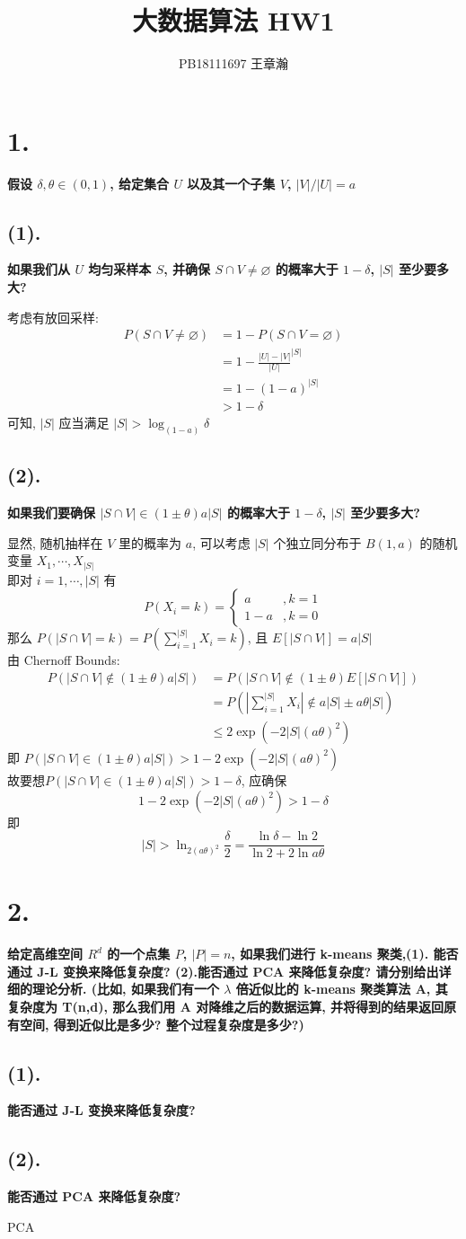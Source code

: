 \documentclass[UTF8]{article}
\title{大数据算法 HW1}
\author{PB18111697 王章瀚}
\newcommand{\jumpLine} {\hspace*{\fill} \par}
\begin{document}
\section*{1.}
\noindent \textbf{假设 $\delta, \theta\in (0,1)$, 给定集合 $U$ 以及其一个子集 $V$, $|V|/|U|=a$}
\subsection*{(1).}
\noindent \textbf{如果我们从 $U$ 均匀采样本 $S$, 并确保 $S\cap V\not=\varnothing$ 的概率大于 $1-\delta$, $|S|$ 至少要多大?}
\jumpLine \noindent 
考虑有放回采样:
\begin{align*}
	P(S\cap V\not=\varnothing)&=1-P(S\cap V=\varnothing) \\
	&=1- \frac{|U|-|V|}{|U|}^{|S|} \\
	&=1-(1-a)^{|S|} \\
	&>1-\delta
\end{align*}
可知, $|S|$ 应当满足 $|S|>\log_{(1-a)}\delta$

\subsection*{(2).}
\noindent \textbf{如果我们要确保 $|S\cap V|\in (1\pm\theta)a|S|$ 的概率大于 $1-\delta$, $|S|$ 至少要多大?}
\jumpLine \noindent 
显然, 随机抽样在 $V$ 里的概率为 $a$, 可以考虑 $|S|$ 个独立同分布于 $B(1,a)$ 的随机变量 $X_1,\cdots,X_{|S|}$\\
即对 $i=1,\cdots,|S|$ 有
$$P(X_i=k)=\left\{\begin{array}{ll}a & ,k=1 \\ 1-a & ,k = 0\end{array}\right.$$
那么 $P(|S\cap V|=k)=P(\sum\limits_{i=1}^{|S|}X_i=k)$, 且 $E[|S\cap V|]=a|S|$ \\
由 Chernoff Bounds: 
\begin{align*}
	P(|S\cap V|\notin (1\pm\theta)a|S|)&=P(|S\cap V|\notin (1\pm\theta)E[|S\cap V|])\\
	&=P\left(\left|\sum\limits_{i=1}^{|S|}X_i\right|\notin a|S|\pm a\theta|S| \right) \\
	&\le 2\exp(-2|S|(a\theta)^2)
\end{align*}
即 $P(|S\cap V|\in (1\pm\theta)a|S|)>1-2\exp(-2|S|(a\theta)^2)$ \\
故要想$P(|S\cap V|\in (1\pm\theta)a|S|)>1-\delta$, 应确保
$$1-2\exp(-2|S|(a\theta)^2) > 1-\delta$$
即 $$|S|>\ln_{2(a\theta)^2}\frac{\delta}{2}=\frac{\ln\delta-\ln2}{\ln2+2\ln a\theta}$$


\section*{2.}
\noindent \textbf{给定高维空间 $R^d$ 的一个点集 $P$, $|P|=n$, 如果我们进行 k-means 聚类,(1). 能否通过 J-L 变换来降低复杂度? (2).能否通过 PCA 来降低复杂度? 请分别给出详细的理论分析. (比如, 如果我们有一个 $\lambda$ 倍近似比的 k-means 聚类算法 A, 其复杂度为 T(n,d), 那么我们用 A 对降维之后的数据运算, 并将得到的结果返回原有空间, 得到近似比是多少? 整个过程复杂度是多少?)}
\subsection*{(1).}
\noindent \textbf{能否通过 J-L 变换来降低复杂度?}
\jumpLine \noindent 

\subsection*{(2).}
\noindent \textbf{能否通过 PCA 来降低复杂度?}
\jumpLine \noindent 
PCA
\end{document}
